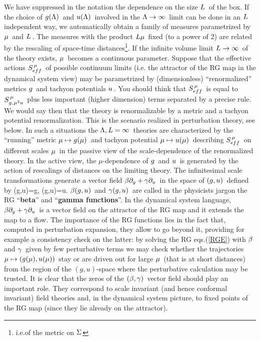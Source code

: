 We have suppressed in the notation the dependence on the size \s$L\hspace{0.05cm}$
of the box. If the choice of \s$g(\Lambda)\hspace{0.05cm}$ and \s$u(\Lambda)\hspace{0.05cm}$ involved
in the \s$\Lambda\to\infty\hspace{0.05cm}$ limit can be done in an \s$L\hspace{0.05cm}$ independent
way, we automatically obtain a family of measures parametrized
by \s$\mu\hspace{0.05cm}$ and \s$L\hspace{0.05cm}$. The measures with the product \s$L\mu\hspace{0.05cm}$ fixed
(to a power of 2) are related by the rescaling of
space-time distances\footnote{i.\s e.\s\s of the metric on \s$\Sigma\hspace{0.025cm}$}.
\m If the infinite volume limit \s$L\to\infty\hspace{0.05cm}$
of the theory exists, \s$\mu\hspace{0.05cm}$ becomes a continuous
parameter. Suppose that the effective actions \s$S_{eff}^{\hspace{0.05cm}\mu}\hspace{0.05cm}$
of possible continuum limits (i.e. the attractor of the RG
map in the dynamical system view) may be parametrized
by (dimensionless) ``renormalized'' metrics \s$g\hspace{0.05cm}$ and tachyon potentials
\s$u\hspace{0.05cm}$. \s You should think that \s$S_{eff}^{\hspace{0.05cm}\mu}\hspace{0.05cm}$ is equal to
\s$S^{\hspace{0.05cm}\mu}_{g,\hspace{0.025cm}\mu^2u}\hspace{0.05cm}$ plus less important (higher
dimension) terms separated by a precise rule. We would say then that
the theory is renormalizable by a metric and a tachyon potential
renormalization. This is the scenario realized in
perturbation theory, see below. In such a situations
the \s$\Lambda,L=\infty\hspace{0.05cm}$ theories are characterized
by the ``running'' metric \s$\mu\mapsto g(\mu)\hspace{0.05cm}$
and tachyon potential \s$\mu\mapsto u(\mu)\hspace{0.05cm}$ describing
\s$S_{eff}^{\hspace{0.05cm}\mu}\hspace{0.05cm}$ on different scales \s$\mu\hspace{0.05cm}$
in the passive view of the scale-dependence of the
renormalized theory. In the active view, the \s$\mu$-dependence
of \s$g\hspace{0.05cm}$ and \s$u\hspace{0.05cm}$ is generated by the action of rescalings
of distances on the limiting theory. The infinitesimal scale
transformations generate a vector field
\s$\beta\partial_g+\gamma\partial_u\hspace{0.05cm}$ in the space of \s$(g,u)\hspace{0.05cm}$
defined by
\qq
\beta(g,u)=\mu{_\da\over^{\da\mu}}\m g\s,
\quad\quad\gamma(g,u)=\mu{_\da\over^{\da\mu}}\m u\s.
\label{RGE}
\qqq
$\beta(g,u)\hspace{0.05cm}$ and \s$\gamma(g,u)\hspace{0.05cm}$ are called in the
physicists jargon the RG ``{\bf beta}'' and ``{\bf gamma functions}''.
In the dynamical system language, \s$\beta\partial_g+\gamma\partial_u\hspace{0.05cm}$
is a vector field on the attractor of the RG map
and it extends the map to a flow.
The importance of the RG functions lies in the fact that, computed
in perturbation expansion, they allow to go beyond it,
providing for example a consistency check
on the latter: by solving the RG eqs.\s\s (\ref{RGE})
with \s$\beta\hspace{0.05cm}$ and \s$\gamma\hspace{0.05cm}$ given by few perturbative
terms we may check whether the trajectories
\s$\mu\mapsto(g(\mu),u(\mu))\hspace{0.05cm}$ stay or are driven out
for large \s$\mu\hspace{0.05cm}$ (that is at short distances)
from the region of the \s$(g,u)$-space
where the perturbative calculation may be trusted.
It is clear that the zeros of the \s$(\beta,\gamma)\hspace{0.05cm}$
vector field should play an important role. They correspond
to scale invariant (and hence conformal
invariant) field theories and, in the dynamical system picture,
to fixed points of the RG map (since they lie already
on the attractor).
\vskip 0.4cm

